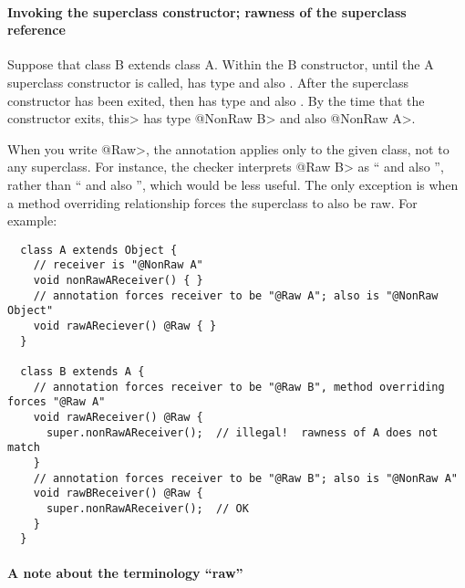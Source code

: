 \paragraph{Invoking the superclass constructor; rawness of the superclass reference}

Suppose that class B extends class A.  Within the B
constructor, until the A superclass constructor is called,  has
type  and also .  After the
superclass constructor has been exited, then  has type
 and also .
By the time that the constructor exits, \<this> has type \<@NonRaw B> and
also \<@NonRaw A>.

When you write \<@Raw>, the annotation applies only to the given class, not
to any superclass.  For instance, the checker interprets \<@Raw B> as
`` and also '', rather than
`` and also '', which would be less useful.  The
only exception is when a method overriding relationship forces the
superclass to also be raw.  For example:

\begin{Verbatim}
  class A extends Object {
    // receiver is "@NonRaw A"
    void nonRawAReceiver() { }
    // annotation forces receiver to be "@Raw A"; also is "@NonRaw Object"
    void rawAReciever() @Raw { }
  }

  class B extends A {
    // annotation forces receiver to be "@Raw B", method overriding forces "@Raw A"
    void rawAReceiver() @Raw {
      super.nonRawAReceiver();  // illegal!  rawness of A does not match
    }
    // annotation forces receiver to be "@Raw B"; also is "@NonRaw A"
    void rawBReceiver() @Raw {
      super.nonRawAReceiver();  // OK
    }
  }
\end{Verbatim}







\paragraph{A note about the terminology ``raw''}

